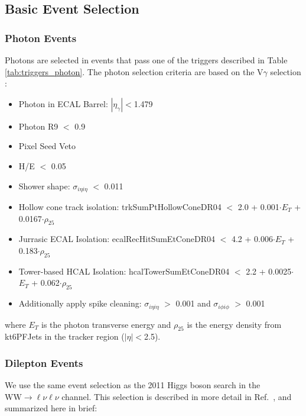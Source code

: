 \clearpage

\subsection{Basic Event Selection}

\subsubsection{Photon Events}

Photons are selected in events that pass one of the triggers described in Table \ref{tab:triggers_photon}.
The photon selection criteria are based on the $\mathrm{V}\gamma$ selection \cite{ref:vgamma}:

\begin{itemize}
\item Photon in ECAL Barrel: $|\eta_\gamma|$$<$1.479
\item Photon R9 $<$ 0.9
\item Pixel Seed Veto
\item H/E $<$ 0.05
\item Shower shape: $\sigma_{i\eta i\eta}$ $<$ 0.011
\item Hollow cone track isolation: trkSumPtHollowConeDR04 $<$ 2.0 + 0.001$\cdot$$E_T$ + 0.0167$\cdot$$\rho_{25}$
\item Jurrasic ECAL Isolation: ecalRecHitSumEtConeDR04 $<$ 4.2 + 0.006$\cdot$$E_T$ + 0.183$\cdot$$\rho_{25}$
\item Tower-based HCAL Isolation: hcalTowerSumEtConeDR04 $<$ 2.2 + 0.0025$\cdot$$E_T$ + 0.062$\cdot$$\rho_{25}$
\item Additionally apply spike cleaning: $\sigma_{i\eta i\eta}$ $>$ 0.001 and $\sigma_{i\phi i\phi}$ $>$ 0.001
\end{itemize}

where $E_T$ is the photon transverse energy and $\rho_{25}$ is the energy density from kt6PFJets in the tracker region ($|\eta|$$<$2.5).

\subsubsection{Dilepton Events}

We use the same event selection as the 2011 Higgs boson search in the  $\mathrm{WW}\rightarrow\ell\nu\ell\nu$ channel.
This selection is described in more detail in Ref.~\cite{ref:hwwsmurfs}, and summarized here in brief:


